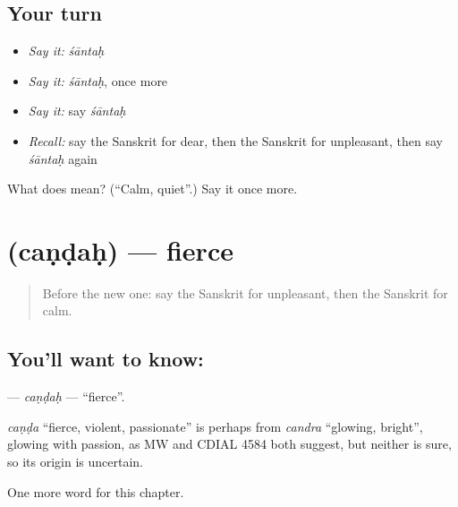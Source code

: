 \subsection*{Your turn}
\begin{itemize}
\raggedright
  \item \emph{Say it:} \emph{śāntaḥ}
  \item \emph{Say it:} \emph{śāntaḥ}, once more
  \item \emph{Say it:} say \emph{śāntaḥ}
  \item \emph{Recall:} say the Sanskrit for dear, then the Sanskrit for unpleasant, then say \emph{śāntaḥ} again
\end{itemize}

\begin{tcolorbox}[breakable,colback=teal!4,colframe=teal!35!black,title={Before you move on}]
What does  mean? (\textquotedblleft{}Calm, quiet\textquotedblright{}.) Say it once more.
\end{tcolorbox}
\section[\texorpdfstring{\sk{चण्डः} (caṇḍaḥ)}{चण्डः (caṇḍaḥ)}]{ (caṇḍaḥ) — fierce}

\label{lesson:SA-C156-candah}



\begin{quote}
Before the new one: say the Sanskrit for unpleasant, then the Sanskrit for calm.
\end{quote}

\subsection*{You'll want to know: }
\textbf{} — \emph{caṇḍaḥ} — \textquotedblleft{}fierce\textquotedblright{}.

\begin{cousinweb}
\emph{caṇḍa} \textquotedblleft{}fierce, violent, passionate\textquotedblright{} is perhaps from \emph{candra} \textquotedblleft{}glowing, bright\textquotedblright{}, glowing with passion, as MW and CDIAL 4584 both suggest, but neither is sure, so its origin is uncertain.
\end{cousinweb}

\begin{grammarlens}[title={What you've built}]
One more word for this chapter.
\end{grammarlens}

